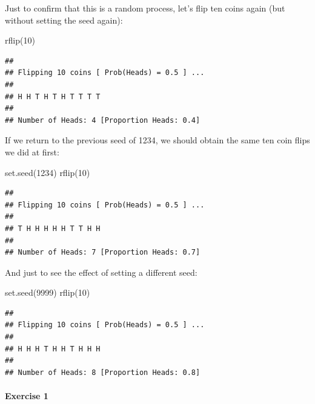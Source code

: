 \documentclass[
]{book}
\newenvironment{Shaded}{\begin{snugshade}}{\end{snugshade}}
\newcommand{\DecValTok}[1]{\textcolor[rgb]{0.00,0.00,0.81}{#1}}
\newcommand{\FunctionTok}[1]{\textcolor[rgb]{0.00,0.00,0.00}{#1}}
\newcommand{\NormalTok}[1]{#1}
\begin{document}
Just to confirm that this is a random process, let's flip ten coins again (but without setting the seed again):

\begin{Shaded}
\begin{Highlighting}[]
\FunctionTok{rflip}\NormalTok{(}\DecValTok{10}\NormalTok{)}
\end{Highlighting}
\end{Shaded}

\begin{verbatim}
## 
## Flipping 10 coins [ Prob(Heads) = 0.5 ] ...
## 
## H H T H T H T T T T
## 
## Number of Heads: 4 [Proportion Heads: 0.4]
\end{verbatim}

If we return to the previous seed of 1234, we should obtain the same ten coin flips we did at first:

\begin{Shaded}
\begin{Highlighting}[]
\FunctionTok{set.seed}\NormalTok{(}\DecValTok{1234}\NormalTok{)}
\FunctionTok{rflip}\NormalTok{(}\DecValTok{10}\NormalTok{)}
\end{Highlighting}
\end{Shaded}

\begin{verbatim}
## 
## Flipping 10 coins [ Prob(Heads) = 0.5 ] ...
## 
## T H H H H H T T H H
## 
## Number of Heads: 7 [Proportion Heads: 0.7]
\end{verbatim}

And just to see the effect of setting a different seed:

\begin{Shaded}
\begin{Highlighting}[]
\FunctionTok{set.seed}\NormalTok{(}\DecValTok{9999}\NormalTok{)}
\FunctionTok{rflip}\NormalTok{(}\DecValTok{10}\NormalTok{)}
\end{Highlighting}
\end{Shaded}

\begin{verbatim}
## 
## Flipping 10 coins [ Prob(Heads) = 0.5 ] ...
## 
## H H H T H H T H H H
## 
## Number of Heads: 8 [Proportion Heads: 0.8]
\end{verbatim}

\hypertarget{exercise-1-5}{%
\paragraph*{Exercise 1}\label{exercise-1-5}}
\end{document}

